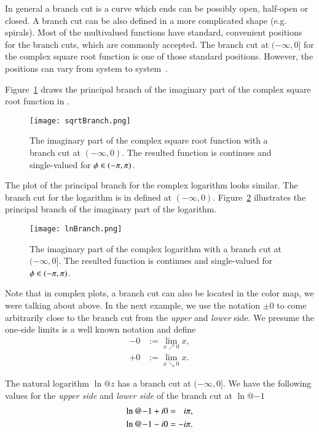 In general a branch cut is a curve which ends can be possibly open, half-open or closed. A branch cut can be also defined in a more complicated shape (e.g. spirals). Most of the multivalued functions have standard, convenient positions for the branch cuts, which are commonly accepted. The branch cut at $(-\infty, 0]$ for the complex square root function is one of those standard positions. However, the positions can vary from system to system~\cite{Branches:acot}.

Figure~\ref{fig:sqrtBranch} draws the principal branch of the imaginary part of the complex square root function in \Maple.
 
\begin{figure}[ht]
	\centering
	\texttt{[image: sqrtBranch.png]}
	\caption{The imaginary part of the complex square root function with a branch cut at $(-\infty, 0)$. The resulted function is continues and single-valued for $\phi \in (-{\pi}, {\pi})$.}
	\label{fig:sqrtBranch}
\end{figure}

The plot of the principal branch for the complex logarithm looks similar. The branch cut for the logarithm is in \Maple{} defined at $(-\infty,0)$. Figure~\ref{fig:lnBranch} illustrates the principal branch of the imaginary part of the logarithm.

\begin{figure}[H]
	\centering
	\texttt{[image: lnBranch.png]}
	\caption{The imaginary part of the complex logarithm with a branch cut at $(-\infty, 0]$. The resulted function is continues and single-valued for $\phi \in (-{\pi}, {\pi})$.}
	\label{fig:lnBranch}
\end{figure}

Note that in complex plots, a branch cut can also be located in the color map, we were talking about above. In the next example, we use the notation $\pm 0$ to come arbitrarily close to the branch cut from the \textit{upper} and \textit{lower} side. We presume the one-side limits is a well known notation and define
\begin{align}
-0 &:= \underset{x\nearrow 0}{\lim}x,\\
+0 &:= \underset{x\searrow 0}{\lim}x.
\end{align}

The natural logarithm $\ln@{z}$ has a branch cut at $(-\infty,0]$. We have the following values for the \textit{upper side} and \textit{lower side} of the branch cut at $\ln@{-1}$
\begin{align}
\ln@{-1+\iunit 0} &=\hphantom{-}\iunit \cpi,\label{eq:ln-up}\\
\ln@{-1-\iunit 0} &= -\iunit \cpi.\label{eq:ln-down}
\end{align}

